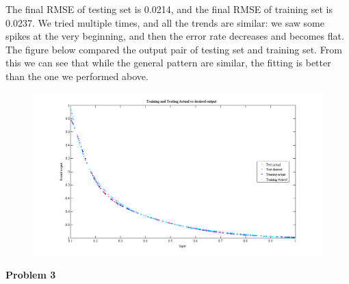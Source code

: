 \documentclass[epsfig]{article}
\def\bpar{\vskip26pt}
\def\npar{\vskip13pt}
\def\spar{\vskip10pt}
\begin{document}
The final RMSE of testing set is 0.0214, and the final RMSE of training set is 0.0237. We tried multiple times, and all the trends are similar: we saw some spikes at the very beginning, and then the error rate decreases and becomes flat.
\spar
The figure below compared the output pair of testing set and training set. From this we can see that while the general pattern are similar, the fitting is better than the one we performed above.
\begin{figure}[!htb] 
	\centering\includegraphics[width=6in]{fig6.png} 
\end{figure} 

{\bf 
	\npar
	Problem 3
	\bpar
}
\end{document}
